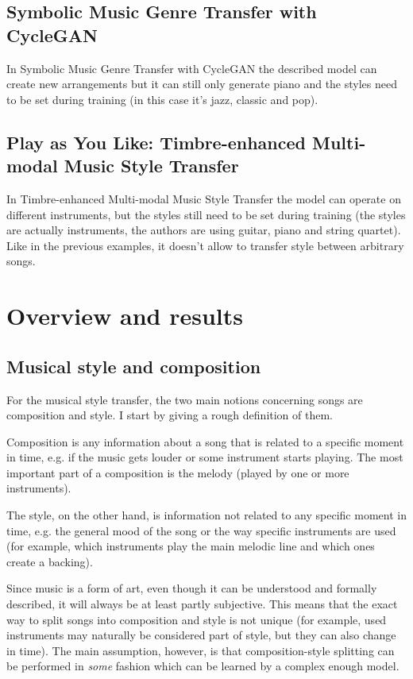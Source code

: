 \documentclass[en]{pracamgr}
\begin{document}
\section{Symbolic Music Genre Transfer with CycleGAN}

In Symbolic Music Genre Transfer with CycleGAN \cite{cyclegan} the described model can create new arrangements but it can still only generate piano and the styles need to be set during training (in this case it's jazz, classic and pop).

\section{Play as You Like: Timbre-enhanced Multi-modal Music Style Transfer}

In Timbre-enhanced Multi-modal Music Style Transfer \cite{multimodal} the model can operate on different instruments, but the styles still need to be set during training (the styles are actually instruments, the authors are using guitar, piano and string quartet).
Like in the previous examples, it doesn't allow to transfer style between arbitrary songs.

\chapter{Overview and results}

\section{Musical style and composition}

For the musical style transfer, the two main notions concerning songs are composition and style.
I start by giving a rough definition of them.

Composition is any information about a song that is related to a specific moment in time, e.g. if the music gets louder or some instrument starts playing.
The most important part of a composition is the melody (played by one or more instruments).

The style, on the other hand, is information not related to any specific moment in time, e.g. the general mood of the song or the way specific instruments are used (for example, which instruments play the main melodic line and which ones create a backing).

Since music is a form of art, even though it can be understood and formally described, it will always be at least partly subjective.
This means that the exact way to split songs into composition and style is not unique (for example, used instruments may naturally be considered part of style, but they can also change in time).
The main assumption, however, is that composition-style splitting can be performed in \emph{some} fashion which can be learned by a complex enough model.
\end{document}
